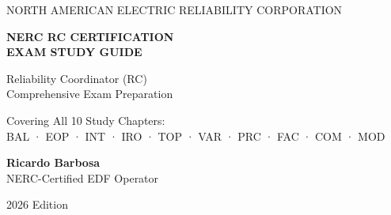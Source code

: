 \documentclass[12pt,twoside,openright]{memoir}
\begin{document}
\begin{titlingpage}
  \pagecolor{nercnavy}
  \color{white}
  \vspace*{2cm}


  \begin{center}
    {\fontsize{11}{13}\selectfont\sffamily\color{nerccyan}
      NORTH AMERICAN ELECTRIC RELIABILITY CORPORATION}

    \vspace{0.4cm}
    {\fontsize{36}{40}\selectfont\bfseries\sffamily
      NERC RC CERTIFICATION\\
      EXAM STUDY GUIDE}

    \vspace{0.5cm}

    \vspace{0.5cm}
    {\fontsize{18}{22}\selectfont\sffamily\color{nercyellow}
      Reliability Coordinator (RC)\\
      Comprehensive Exam Preparation}

    \vspace{1.5cm}
    {\fontsize{13}{16}\selectfont\sffamily\color{white!80}
      Covering All 10 Study Chapters:\\
      BAL · EOP · INT · IRO · TOP · VAR · PRC · FAC · COM · MOD}

    \vspace{2cm}
    {\fontsize{14}{17}\selectfont\sffamily\bfseries Ricardo Barbosa}\\
    {\fontsize{11}{14}\selectfont\sffamily\color{white!70}
      NERC-Certified EDF Operator}

    \vspace{1cm}
    {\fontsize{10}{12}\selectfont\sffamily\color{white!50} 2026 Edition}
  \end{center}
\end{titlingpage}
\pagecolor{white}
\color{black}

\frontmatter
\tableofcontents
\clearpage
\end{document}
